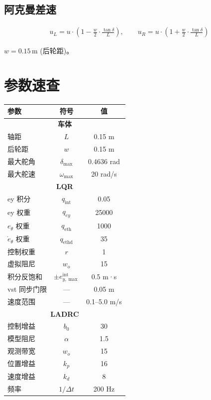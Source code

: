 \documentclass[11pt,a4paper]{article}
\begin{document}
\subsection{阿克曼差速}

\begin{align}
\boxed{
u_L = u \cdot \left(1 - \frac{w}{2} \cdot \frac{\tan\delta}{L}\right),
\qquad
u_R = u \cdot \left(1 + \frac{w}{2} \cdot \frac{\tan\delta}{L}\right)
}
\end{align}

$w = 0.15\,\text{m}$ (后轮距)。

\section{参数速查}

\begin{center}
\begin{tabular}{l|c|c}
\toprule
参数 & 符号 & 值 \\
\midrule
\multicolumn{3}{c}{\textbf{车体}} \\
轴距 & $L$ & 0.15 m \\
后轮距 & $w$ & 0.15 m \\
最大舵角 & $\delta_{\max}$ & 0.4636 rad \\
最大舵速 & $\omega_{\max}$ & 20 rad/s \\
\midrule
\multicolumn{3}{c}{\textbf{LQR}} \\
ey 积分 & $q_{\text{int}}$ & 0.05 \\
ey 权重 & $q_{ey}$ & 25000 \\
$e_\theta$ 权重 & $q_{\text{eth}}$ & 1000 \\
$\dot{e}_\theta$ 权重 & $q_{\text{ethd}}$ & 35 \\
控制权重 & $r$ & 1 \\
虚拟阻尼 & $w_o$ & 15 \\
积分反饱和 & $\pm e_{y,\max}^{\text{int}}$ & 0.5 m·s \\
vst 同步门限 & --- & 0.05 m \\
速度范围 & --- & 0.1--5.0 m/s \\
\midrule
\multicolumn{3}{c}{\textbf{LADRC}} \\
控制增益 & $b_0$ & 30 \\
模型阻尼 & $\alpha$ & 1.5 \\
观测带宽 & $w_o$ & 15 \\
位置增益 & $k_p$ & 16 \\
速度增益 & $k_d$ & 8 \\
频率 & $1/\Delta t$ & 200 Hz \\
\bottomrule
\end{tabular}
\end{center}
\end{document}
